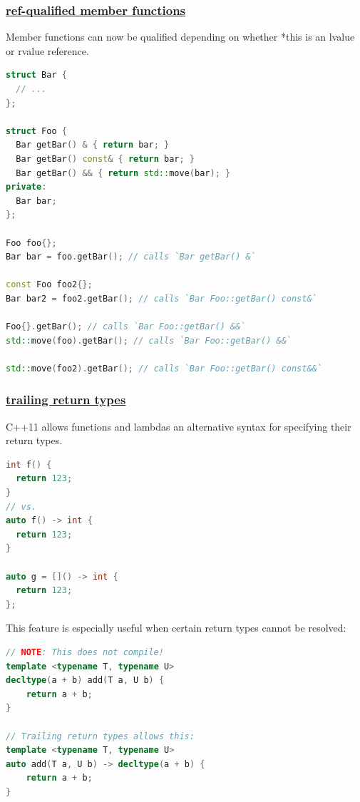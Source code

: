 \subsubsection{\href{https://github.com/AnthonyCalandra/modern-cpp-features/tree/master\#ref-qualified-member-functions}
                    {ref-qualified member functions}}
Member functions can now be qualified depending on whether *this is an lvalue or rvalue reference.

\begin{lstlisting}[language=C++]
struct Bar {
  // ...
};

struct Foo {
  Bar getBar() & { return bar; }
  Bar getBar() const& { return bar; }
  Bar getBar() && { return std::move(bar); }
private:
  Bar bar;
};

Foo foo{};
Bar bar = foo.getBar(); // calls `Bar getBar() &`

const Foo foo2{};
Bar bar2 = foo2.getBar(); // calls `Bar Foo::getBar() const&`

Foo{}.getBar(); // calls `Bar Foo::getBar() &&`
std::move(foo).getBar(); // calls `Bar Foo::getBar() &&`

std::move(foo2).getBar(); // calls `Bar Foo::getBar() const&&`
\end{lstlisting}

\subsubsection{\href{https://github.com/AnthonyCalandra/modern-cpp-features/tree/master\#trailing-return-types}
                    {trailing return types}}
C++11 allows functions and lambdas an alternative syntax for specifying their return types.
\begin{lstlisting}[language=C++]
int f() {
  return 123;
}
// vs.
auto f() -> int {
  return 123;
}

auto g = []() -> int {
  return 123;
};
\end{lstlisting}
This feature is especially useful when certain return types cannot be resolved:

\begin{lstlisting}[language=C++]
// NOTE: This does not compile!
template <typename T, typename U>
decltype(a + b) add(T a, U b) {
    return a + b;
}

// Trailing return types allows this:
template <typename T, typename U>
auto add(T a, U b) -> decltype(a + b) {
    return a + b;
}
\end{lstlisting}

